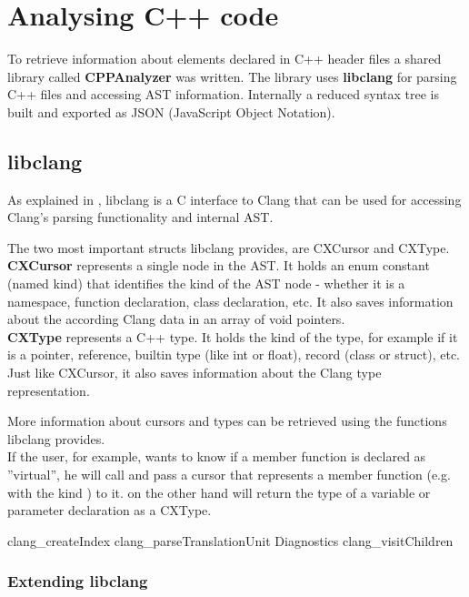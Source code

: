\chapter{Analysing C++ code}
\label{chap:AnalysingCPP}

To retrieve information about elements declared in C++ header files a shared library called \textbf{CPPAnalyzer} was written. The library uses \textbf{libclang} for parsing C++ files and accessing AST information. Internally a reduced syntax tree is built and exported as JSON (JavaScript Object Notation).

\section{libclang}

As explained in , libclang is a C interface to Clang that can be used for accessing Clang's parsing functionality and internal AST.


The two most important structs libclang provides, are CXCursor and CXType.
\\\textbf{CXCursor} represents a single node in the AST. It holds an enum constant (named kind) that identifies the kind of the AST node - whether it is a namespace, function declaration, class declaration, etc. It also saves information about the according Clang data in an array of void pointers.
\\\textbf{CXType} represents a C++ type. It holds the kind of the type, for example if it is a pointer, reference, builtin type (like int or float), record (class or struct), etc. Just like CXCursor, it also saves information about the Clang type representation.

More information about cursors and types can be retrieved using the functions libclang provides.
\\If the user, for example, wants to know if a member function is declared as ''virtual'', he will call  and pass a cursor that represents a member function (e.g. with the kind ) to it.  on the other hand will return the type of a variable or parameter declaration as a CXType.

clang\_createIndex
clang\_parseTranslationUnit
Diagnostics 
clang\_visitChildren

\subsection{Extending libclang}

